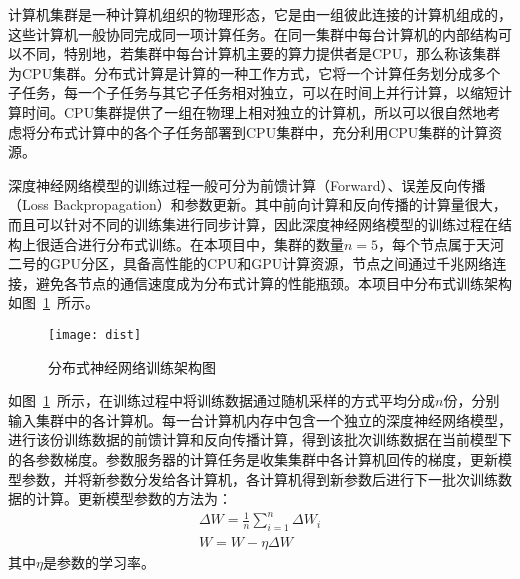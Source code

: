 计算机集群是一种计算机组织的物理形态，它是由一组彼此连接的计算机组成的，这些计算机一般协同完成同一项计算任务。在同一集群中每台计算机的内部结构可以不同，特别地，若集群中每台计算机主要的算力提供者是CPU，那么称该集群为CPU集群。分布式计算是计算的一种工作方式，它将一个计算任务划分成多个子任务，每一个子任务与其它子任务相对独立，可以在时间上并行计算，以缩短计算时间。CPU集群提供了一组在物理上相对独立的计算机，所以可以很自然地考虑将分布式计算中的各个子任务部署到CPU集群中，充分利用CPU集群的计算资源。

深度神经网络模型的训练过程一般可分为前馈计算（Forward）、误差反向传播（Loss Backpropagation）和参数更新。其中前向计算和反向传播的计算量很大，而且可以针对不同的训练集进行同步计算，因此深度神经网络模型的训练过程在结构上很适合进行分布式训练。在本项目中，集群的数量$n=5$，每个节点属于天河二号的GPU分区，具备高性能的CPU和GPU计算资源，节点之间通过千兆网络连接，避免各节点的通信速度成为分布式计算的性能瓶颈。本项目中分布式训练架构如图~\ref{fig:dist}~所示。

\begin{figure}[!ht]
\centering
\texttt{[image: dist]}
\caption{分布式神经网络训练架构图}
\label{fig:dist}
\end{figure}

如图~\ref{fig:dist}~所示，在训练过程中将训练数据通过随机采样的方式平均分成$n$份，分别输入集群中的各计算机。每一台计算机内存中包含一个独立的深度神经网络模型，进行该份训练数据的前馈计算和反向传播计算，得到该批次训练数据在当前模型下的各参数梯度。参数服务器的计算任务是收集集群中各计算机回传的梯度，更新模型参数，并将新参数分发给各计算机，各计算机得到新参数后进行下一批次训练数据的计算。更新模型参数的方法为：
\begin{eqnarray}
\Delta W=\frac{1}{n}\sum_{i = 1}^{n}\Delta W_i \\
W=W-\eta\Delta W
\end{eqnarray}
其中$\eta$是参数的学习率。